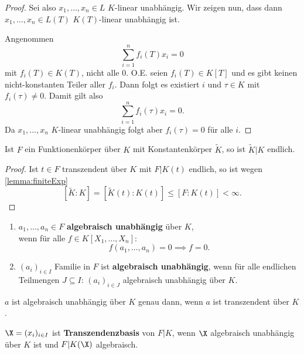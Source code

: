\begin{proof}
    Sei also $x_1,\ldots,x_n \in L$ $K$-linear unabhängig. Wir zeigen nun, dass dann
    $x_1,\ldots,x_n \in L(T)$ $K(T)$-linear unabhängig ist.
    
    Angenommen $$ \sum\limits_{i=1}^n f_i(T)x_i = 0$$ mit $f_i(T) \in K(T)$, nicht alle 0.
    O.E. seien $f_i(T) \in K[T]$ und es gibt keinen nicht-konstanten Teiler aller $f_i$.
    Dann folgt es existiert $i$ und $\tau \in K$ mit $f_i(\tau) \neq 0$. 
    Damit gilt also $$ \sum\limits_{i=1}^n f_i(\tau)x_i = 0.$$
    Da $x_1,\ldots,x_n$ $K$-linear unabhängig folgt aber $f_i(\tau) = 0$ für alle $i$.

\end{proof}

\begin{satz}\label{satz:1.9}
    Ist $F$ ein Funktionenkörper über $K$ mit Konstantenkörper $\widetilde{K}$,
    so ist $\widetilde{K}|K$ endlich.
\end{satz}
\begin{proof}
    Ist $t\in F$ transzendent über $K$ mit $F|K(t)$ endlich,
    so ist wegen \cref{lemma:finiteExp} 
    $$ [\widetilde{K}:K] = [\widetilde{K}(t):K(t)] \leq [F:K(t)] < \infty.$$
\end{proof}

\begin{definition}
    \begin{enumerate}[label=\arabic*)]
        \item $a_1,\ldots,a_n \in F$ \textbf{algebraisch unabhängig} über $K$,\\
        wenn für alle $f \in K[X_1,\ldots,X_n]$:
        $$ f(a_1,\ldots,a_n) = 0 \implies f=0. $$

        \item $(a_i)_{i \in I}$ Familie in $F$ ist \textbf{algebraisch unabhängig},
        wenn für alle endlichen Teilmengen $J \subseteq I$:
        $ (a_i)_{i \in J}$ algebraisch unabhängig über $K$.
    \end{enumerate}
\end{definition}

\begin{beispiel}
    $a$ ist algebraisch unabhängig über $K$ genau dann, wenn $a$ ist transzendent über $K$.
\end{beispiel}

\begin{definition}
    $\X = (x_i)_{i \in I}$ ist \textbf{Transzendenzbasis} von $F|K$, 
    wenn $\X$ algebraisch unabhängig über $K$ ist und $F|K(\X)$ algebraisch.
\end{definition}

